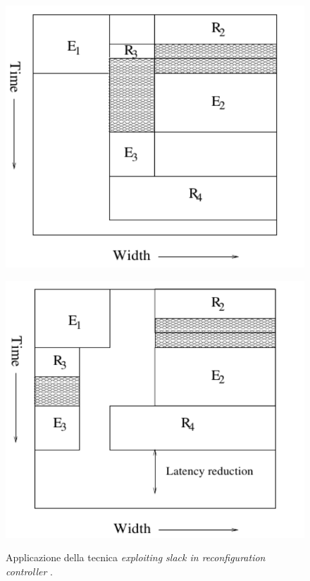 \begin{figure}[t]
\begin{minipage}[b]{0.4\textwidth}
 \begin{center}
\includegraphics[width=\linewidth]{capitoli/figure/cap3/SlackRecController1.pdf}
\label{fig:slackRecController1}
 \end{center}
\end{minipage}
\hfill
\begin{minipage}[b]{0.4\textwidth}
 \begin{center}
\includegraphics[width=\linewidth]{capitoli/figure/cap3/SlackRecController2.pdf}
\label{fig:slackRecController2}
 \end{center}
\end{minipage}
\caption[Applicazione della tecnica exploiting slack in reconfiguration 
controller]{Applicazione della tecnica \emph{exploiting slack in reconfiguration 
controller} \cite{BanerjeePARLGRAN}.}
\label{fig:slackRecController}
\end{figure}


